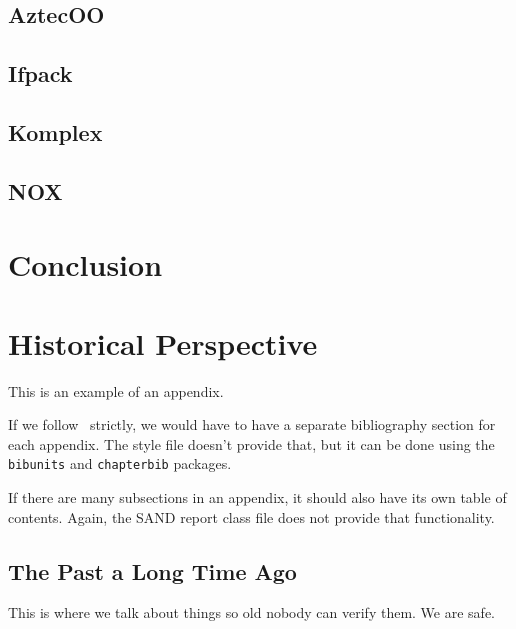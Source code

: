 \documentclass[12pt,strict]{SANDreport}
\begin{document}
\subsection{AztecOO}

\subsection{Ifpack}

\subsection{Komplex}

\subsection{NOX}
	

    \section{Conclusion}


    \clearpage
    
    


    \appendix
    \section{Historical Perspective}
	This is an example of an appendix.

	If we follow~\cite{Sand98-0730} strictly, we would have to
	have a separate bibliography section for each appendix.
	The style file doesn't provide that, but it can be done
	using the {\tt bibunits} and {\tt chapterbib} packages.

	If there are many subsections in an appendix, it should also
	have its own table of contents. Again, the SAND report class
	file does not provide that functionality.

	\subsection{The Past a Long Time Ago}
	    This is where we talk about things so old nobody
	    can verify them. We are safe.
\end{document}
